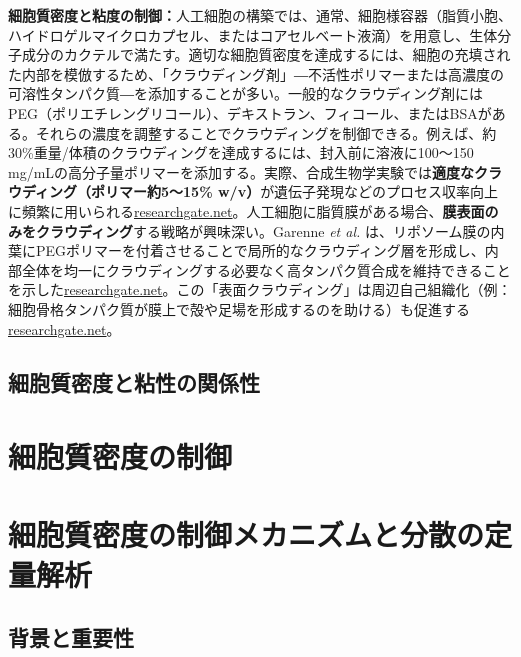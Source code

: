 \textbf{細胞質密度と粘度の制御：}人工細胞の構築では、通常、細胞様容器（脂質小胞、ハイドロゲルマイクロカプセル、またはコアセルベート液滴）を用意し、生体分子成分のカクテルで満たす。適切な細胞質密度を達成するには、細胞の充填された内部を模倣するため、「クラウディング剤」―不活性ポリマーまたは高濃度の可溶性タンパク質―を添加することが多い。一般的なクラウディング剤にはPEG（ポリエチレングリコール）、デキストラン、フィコール、またはBSAがある。それらの濃度を調整することでクラウディングを制御できる。例えば、約30\%重量/体積のクラウディングを達成するには、封入前に溶液に100～150 mg/mLの高分子量ポリマーを添加する。実際、合成生物学実験では\textbf{適度なクラウディング（ポリマー約5～15\% w/v）}が遺伝子発現などのプロセス収率向上に頻繁に用いられる\href{https://www.researchgate.net/publication/341582539_Analysis_of_Cytoplasmic_and_Membrane_Molecular_Crowding_in_Genetically_Programmed_Synthetic_Cells\#:~:text=,}{researchgate.net}。人工細胞に脂質膜がある場合、\textbf{膜表面のみをクラウディング}する戦略が興味深い。Garenne \textit{et al.} は、リポソーム膜の内葉にPEGポリマーを付着させることで局所的なクラウディング層を形成し、内部全体を均一にクラウディングする必要なく高タンパク質合成を維持できることを示した\href{https://www.researchgate.net/publication/341582539_Analysis_of_Cytoplasmic_and_Membrane_Molecular_Crowding_in_Genetically_Programmed_Synthetic_Cells\#:~:text=,}{researchgate.net}。この「表面クラウディング」は周辺自己組織化（例：細胞骨格タンパク質が膜上で殻や足場を形成するのを助ける）も促進する\href{https://www.researchgate.net/publication/341582539_Analysis_of_Cytoplasmic_and_Membrane_Molecular_Crowding_in_Genetically_Programmed_Synthetic_Cells\#:~:text=,}{researchgate.net}。

\subsection{細胞質密度と粘性の関係性}
\section{細胞質密度の制御}

\section{細胞質密度の制御メカニズムと分散の定量解析}

\subsection{背景と重要性}

